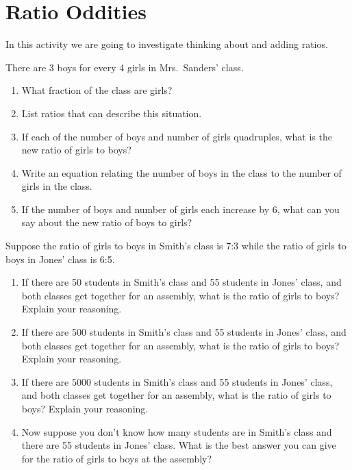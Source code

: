 \newpage
\section{Ratio Oddities}

In this activity we are going to investigate thinking about and adding
ratios.


\begin{prob}
There are 3 boys for every 4 girls in Mrs.\ Sanders' class.
\begin{enumerate}
\item What fraction of the class are girls? 
\item List ratios that can describe this situation. 
\item If each of the number of boys and number of girls quadruples, what is the new ratio of girls to boys?
\item Write an equation relating the number of boys in the class to the number of girls in the class.
\item If the number of boys and number of girls each increase by 6, what can you say about the new ratio of boys to girls?
\end{enumerate}
\end{prob}

\begin{prob}\label{AP:C1}
Suppose the ratio of girls to boys in Smith's class is 7:3 while the
ratio of girls to boys in Jones' class is 6:5.  
\begin{enumerate}
\item If there are 50 students in Smith's class and 55 students in Jones' class, and both
classes get together for an assembly, what is the ratio of girls to
boys? Explain your reasoning.
\item If there are 500 students in Smith's class and 55 students in Jones' class, and both
classes get together for an assembly, what is the ratio of girls to
boys? Explain your reasoning.
\item If there are 5000 students in Smith's class and 55 students in Jones' class, and both
classes get together for an assembly, what is the ratio of girls to
boys? Explain your reasoning.
\item Now suppose you don't know how many students are in Smith's class and there are 55 students in Jones' class. What is the best answer you can give for the ratio of girls to boys at the assembly?
\end{enumerate}
\end{prob}


